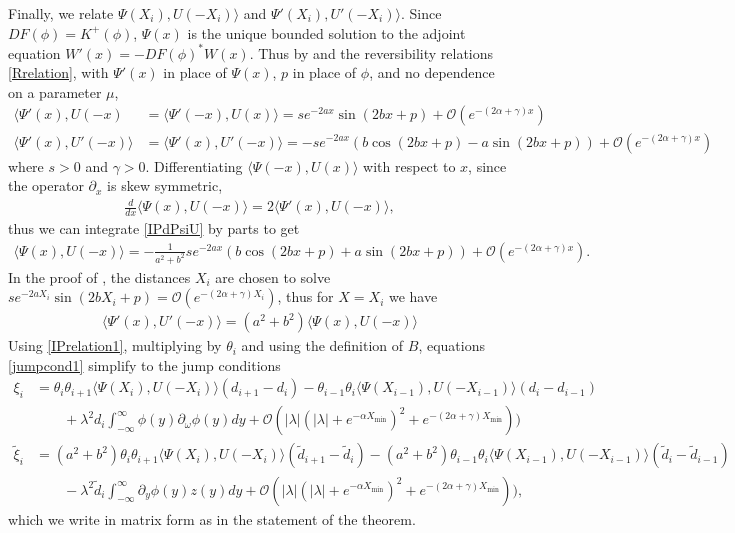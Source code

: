 \documentclass[12pt]{article}
\begin{document}
Finally, we relate $\Psi(X_i), U(-X_i) \rangle$ and $\Psi'(X_i), U'(-X_i) \rangle$. Since $DF(\phi) = K^+(\phi)$, $\Psi(x)$ is the unique bounded solution to the adjoint equation $W'(x) = -DF(\phi)^* W(x)$. Thus by \cite[Lemma 6.1]{Sandstede1998} and the reversibility relations \cref{Rrelation}, with $\Psi'(x)$ in place of $\Psi(x)$, $p$ in place of $\phi$, and no dependence on a parameter $\mu$,
\begin{align}
\langle \Psi'(x), U(-x) &= \langle \Psi'(-x), U(x) \rangle = s e^{-2 a x} \sin(2 b x + p) + \mathcal{O}(e^{-(2 \alpha + \gamma)x}) \label{IPdPsiU} \\
\langle \Psi'(x), U'(-x) \rangle &= 
\langle \Psi'(x), U'(-x) \rangle = -s e^{-2 a x} \left( b \cos(2 b x + p) - a \sin(2 b x + p) \right) + \mathcal{O}(e^{-(2 \alpha + \gamma)x}) \label{IPdPsidU}
\end{align}
where $s > 0$ and $\gamma > 0$. Differentiating $\langle \Psi(-x), U(x) \rangle$ with respect to $x$, since the operator $\partial_x$ is skew symmetric, 
\begin{align*}
\frac{d}{dx} \langle \Psi(x), U(-x) \rangle = 2 \langle \Psi'(x), U(-x) \rangle,
\end{align*}
thus we can integrate \cref{IPdPsiU} by parts to get 
\begin{align*}
\langle \Psi(x), U(-x) \rangle = -\frac{1}{a^2 + b^2} s e^{-2 a x} \left( b \cos(2 b x + p) + a \sin(2 b x + p) \right) + \mathcal{O}(e^{-(2 \alpha + \gamma)x}).
\end{align*}
In the proof of \cite[Theorem 3]{Sandstede1998}, the distances $X_i$ are chosen to solve $s e^{-2 a X_i} \sin(2 b X_i + p) = \mathcal{O}(e^{-(2 \alpha + \gamma)X_i})$, thus for $X = X_i$ we have
\begin{align}\label{IPrelation1}
\langle \Psi'(x), U'(-x) \rangle = (a^2 + b^2)
\langle \Psi(x), U(-x) \rangle
\end{align}
Using \cref{IPrelation1}, multiplying by $\theta_i$ and using the definition of $B$, equations \cref{jumpcond1} simplify to the jump conditions
\begin{align*}
\xi_i &= \theta_i \theta_{i+1} \langle \Psi(X_i), U(-X_i) \rangle (d_{i+1} - d_i) 
- \theta_{i-1} \theta_i  \langle \Psi(X_{i-1}), U(-X_{i-1}) \rangle (d_i - d_{i-1}) \\
&\qquad + \lambda^2 d_i \int_{-\infty}^\infty \phi(y) \partial_\omega \phi(y) dy 
+ \mathcal{O}( |\lambda|(|\lambda| + e^{-\alpha X_{\min}})^2 + e^{-(2 \alpha + \gamma)X_{\min} }) )  \\
\tilde{\xi}_i &= (a^2 + b^2) \theta_i \theta_{i+1} \langle \Psi(X_i), U(-X_i) \rangle (\tilde{d}_{i+1} - \tilde{d}_i)
- (a^2 + b^2) \theta_{i-1} \theta_i \langle \Psi(X_{i-1}), U(-X_{i-1}) \rangle (\tilde{d}_i - \tilde{d}_{i-1}) \\
&\qquad- \lambda^2 \tilde{d}_i \int_{-\infty}^\infty \partial_y \phi(y) z(y) dy
+ \mathcal{O}( |\lambda|(|\lambda| + e^{-\alpha X_{\min}})^2 + e^{-(2 \alpha + \gamma)X_{\min} }) ) ,
\end{align*}
which we write in matrix form as in the statement of the theorem.
\end{document}
